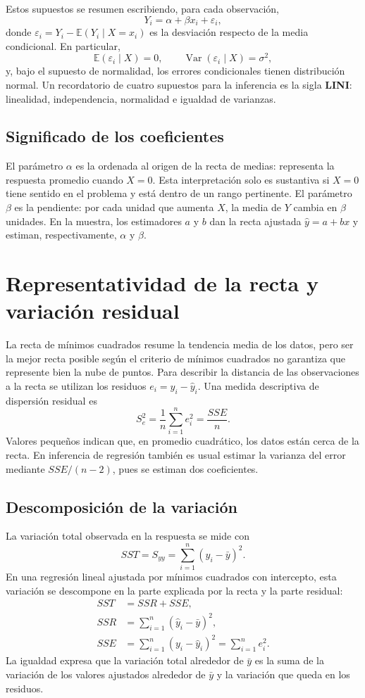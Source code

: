Estos supuestos se resumen escribiendo, para cada observación,
\[
Y_i=\alpha+\beta x_i+\varepsilon_i,
\]
donde $\varepsilon_i=Y_i-\mathbb{E}(Y_i\mid X=x_i)$ es la desviación respecto de la media condicional. En particular,
\[
\mathbb{E}(\varepsilon_i\mid X)=0,\qquad
\operatorname{Var}(\varepsilon_i\mid X)=\sigma^2,
\]
y, bajo el supuesto de normalidad, los errores condicionales tienen distribución normal. Un recordatorio de cuatro supuestos para la inferencia es la sigla \textbf{LINI}: linealidad, independencia, normalidad e igualdad de varianzas.

\subsection{Significado de los coeficientes}

El parámetro $\alpha$ es la ordenada al origen de la recta de medias: representa la respuesta promedio cuando $X=0$. Esta interpretación solo es sustantiva si $X=0$ tiene sentido en el problema y está dentro de un rango pertinente. El parámetro $\beta$ es la pendiente: por cada unidad que aumenta $X$, la media de $Y$ cambia en $\beta$ unidades. En la muestra, los estimadores $a$ y $b$ dan la recta ajustada $\widehat y=a+bx$ y estiman, respectivamente, $\alpha$ y $\beta$.

\section{Representatividad de la recta y variación residual}

La recta de mínimos cuadrados resume la tendencia media de los datos, pero ser la mejor recta posible según el criterio de mínimos cuadrados no garantiza que represente bien la nube de puntos. Para describir la distancia de las observaciones a la recta se utilizan los residuos $e_i=y_i-\widehat y_i$. Una medida descriptiva de dispersión residual es
\[
S_e^2=\frac{1}{n}\sum_{i=1}^{n}e_i^2=\frac{SSE}{n}.
\]
Valores pequeños indican que, en promedio cuadrático, los datos están cerca de la recta. En inferencia de regresión también es usual estimar la varianza del error mediante $SSE/(n-2)$, pues se estiman dos coeficientes.

\subsection{Descomposición de la variación}

La variación total observada en la respuesta se mide con
\[
SST=S_{yy}=\sum_{i=1}^{n}(y_i-\bar y)^2.
\]
En una regresión lineal ajustada por mínimos cuadrados con intercepto, esta variación se descompone en la parte explicada por la recta y la parte residual:
\begin{align*}
SST&=SSR+SSE,\\
SSR&=\sum_{i=1}^{n}(\widehat y_i-\bar y)^2,\\
SSE&=\sum_{i=1}^{n}(y_i-\widehat y_i)^2=\sum_{i=1}^{n}e_i^2.
\end{align*}
La igualdad expresa que la variación total alrededor de $\bar y$ es la suma de la variación de los valores ajustados alrededor de $\bar y$ y la variación que queda en los residuos.

